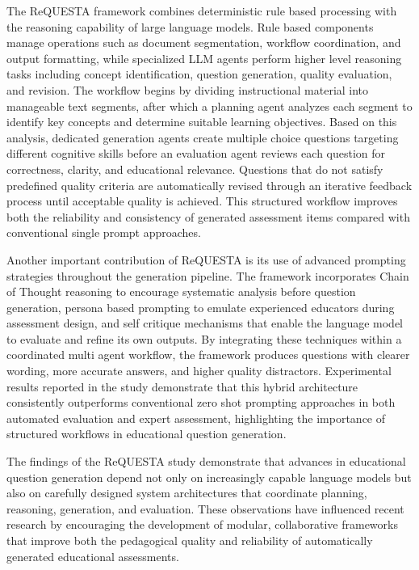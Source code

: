 The ReQUESTA framework combines deterministic rule based processing with the reasoning capability of large language models. Rule based components manage operations such as document segmentation, workflow coordination, and output formatting, while specialized LLM agents perform higher level reasoning tasks including concept identification, question generation, quality evaluation, and revision. The workflow begins by dividing instructional material into manageable text segments, after which a planning agent analyzes each segment to identify key concepts and determine suitable learning objectives. Based on this analysis, dedicated generation agents create multiple choice questions targeting different cognitive skills before an evaluation agent reviews each question for correctness, clarity, and educational relevance. Questions that do not satisfy predefined quality criteria are automatically revised through an iterative feedback process until acceptable quality is achieved. This structured workflow improves both the reliability and consistency of generated assessment items compared with conventional single prompt approaches. \cite{requesta2026}

Another important contribution of ReQUESTA is its use of advanced prompting strategies throughout the generation pipeline. The framework incorporates Chain of Thought reasoning to encourage systematic analysis before question generation, persona based prompting to emulate experienced educators during assessment design, and self critique mechanisms that enable the language model to evaluate and refine its own outputs. By integrating these techniques within a coordinated multi agent workflow, the framework produces questions with clearer wording, more accurate answers, and higher quality distractors. Experimental results reported in the study demonstrate that this hybrid architecture consistently outperforms conventional zero shot prompting approaches in both automated evaluation and expert assessment, highlighting the importance of structured workflows in educational question generation. \cite{requesta2026}

The findings of the ReQUESTA study demonstrate that advances in educational question generation depend not only on increasingly capable language models but also on carefully designed system architectures that coordinate planning, reasoning, generation, and evaluation. These observations have influenced recent research by encouraging the development of modular, collaborative frameworks that improve both the pedagogical quality and reliability of automatically generated educational assessments.
